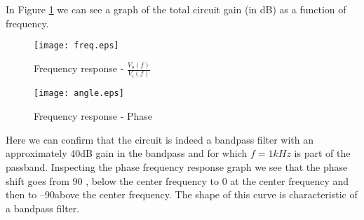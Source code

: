 In Figure \ref{fig:freq_response} we can see a graph of the total circuit gain (in dB) as a function of frequency.


\begin{figure}[H] \centering
\texttt{[image: freq.eps]}
\caption{Frequency response - $\frac{V_o(f)}{V_i(f)}$}
\label{fig:freq_response}
\end{figure}

\begin{figure}[H] \centering
\texttt{[image: angle.eps]}
\caption{Frequency response - Phase}
\label{fig:freq_response_phase}
\end{figure}

Here we can confirm that the circuit is indeed a bandpass filter with an approximately 40dB gain in the bandpass and for which $f = 1 kHz$ is part of the passband. Inspecting the phase frequency response graph we see that the phase shift goes from 90 \degree, below the center frequency to 0 \degree at the center frequency and then to  –90\degree above the center frequency. The shape of this curve is characteristic of a bandpass filter. 





